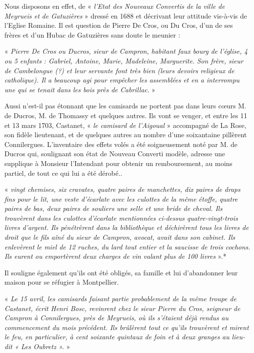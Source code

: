 Nous disposons en effet, de « \textit{l’Etat des Nouveaux Convertis de la ville de Meyrueis et de
Gatuzières} » dressé en 1688 et décrivant leur attitude vis-à-vis de l’Eglise Romaine. Il est
question de Pierre De Cros, ou Du Cros, d’un de ses frères et d’un Hubac de Gatuzières sans
doute le meunier :

« \textit{Pierre De Cros ou Ducros, sieur de Campron, habitant faux bourg de l’église, 4 ou 5
enfants : Gabriel, Antoine, Marie, Madeleine, Marguerite. Son frère, sieur de Cambelongue
(?) et leur servante font très bien (leurs devoirs religieux de catholique). Il a beaucoup agi
pour empêcher les assemblées et en a interrompu une qui se tenait dans les bois près de
Cabrillac}. »

\vspace{0.3cm}

Aussi n’est-il pas étonnant que les camisards ne portent pas dans leurs cœurs M. de Ducros,
M. de Thomassy et quelques autres. Ils vont se venger, et entre les 11 et 13 mars 1703,
Castanet, « \textit{le camisard de l’Aigoual} » accompagné de La Rose, son fidèle lieutenant, et de
quelques autres au nombre d’une soixantaine pillèrent Connilergues. L’inventaire des effets
volés a été soigneusement noté par M. de Ducros qui, soulignant son état de Nouveau
Converti modèle, adresse une supplique à Monsieur l’Intendant pour obtenir un
remboursement, au moins partiel, de tout ce qui lui a été dérobé..

« \textit{vingt chemises, six cravates, quatre paires de manchettes, dix paires de draps fins pour le lit,
une veste d’écarlate avec les culottes de la même étoffe, quatre paires de bas, deux paires de
souliers une selle et une bride de cheval. Ils trouvèrent dans les culottes d’écarlate
mentionnées ci-dessus quatre-vingt-trois livres d’argent. Ils pénétrèrent dans la bibliothèque
et déchirèrent tous les livres de droit que le fils aîné du sieur de Campron, avocat, avait dans
son cabinet. Ils enlevèrent le miel de 12 ruches, du lard tout entier et la saucisse de trois
cochons. Ils eurent ou emportèrent deux charges de vin valant plus de 100 livres} ».*

Il souligne également qu’ils ont été obligés, sa famille et lui d’abandonner leur maison pour
se réfugier à Montpellier.

\vspace{0.2cm}

« \textit{Le 15 avril, les camisards faisant partie probablement de la même troupe de Castanet, écrit
Henri Bosc, revinrent chez le sieur Pierre du Cros, seigneur de Campron à Connilergues,
près de Meyrueis, où ils s’étaient déjà rendus au commencement du mois précédent. Ils
brûlèrent tout ce qu’ils trouvèrent et mirent le feu, en particulier, à cent soixante quintaux de
foin et à deux granges au lieu-dit « Les Oubretz ».} »

